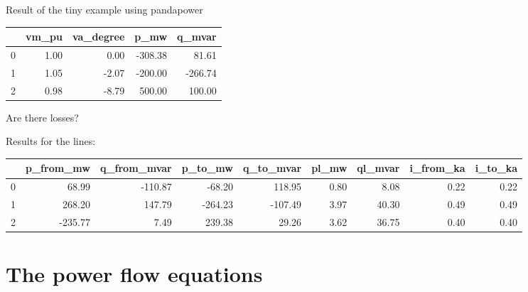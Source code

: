 \begin{frame}{Result of the tiny example using pandapower}
    
    \begin{center}
    \begin{tabular}{|l|r|r|r|r|}
        \hline
        & \textbf{vm\_pu} & \textbf{va\_degree} & \textbf{p\_mw} & \textbf{q\_mvar} \\
        \hline
        0 & 1.00 & 0.00 & -308.38 & 81.61 \\
        \hline
        1 & 1.05 & -2.07 & -200.00 & -266.74 \\
        \hline
        2 & 0.98 & -8.79 & 500.00 & 100.00 \\
        \hline
    \end{tabular}
\end{center}

    Are there losses?
    
    Results for the lines:
    {\scriptsize
    \begin{tabular}{|l|r|r|r|r|r|r|r|r|}
        \hline
        & \textbf{p\_from\_mw} & \textbf{q\_from\_mvar} & \textbf{p\_to\_mw} & \textbf{q\_to\_mvar} & \textbf{pl\_mw} & \textbf{ql\_mvar} & \textbf{i\_from\_ka} & \textbf{i\_to\_ka} \\
        \hline
        0 & 68.99 & -110.87 & -68.20 & 118.95 & 0.80 & 8.08 & 0.22 & 0.22 \\
        \hline
        1 & 268.20 & 147.79 & -264.23 & -107.49 & 3.97 & 40.30 & 0.49 & 0.49 \\
        \hline
        2 & -235.77 & 7.49 & 239.38 & 29.26 & 3.62 & 36.75 & 0.40 & 0.40 \\
        \hline
    \end{tabular}
    }
\end{frame}

\section{The power flow equations}

